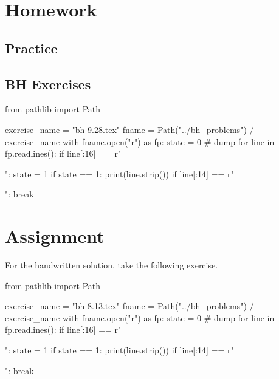 \section{Homework}

\label{sec:homework}

\subsection{Practice}
\label{sec:practice}



\subsection{BH Exercises}
\label{sec:bh-exercises-1}

\begin{pycode}
from pathlib import Path

exercise_name = "bh-9.28.tex"
fname = Path("../bh_problems") / exercise_name
with fname.open("r") as fp:
    state = 0  # dump
    for line in fp.readlines():
        if line[:16] == r"\begin{exercise}":
            state = 1
        if state == 1:
            print(line.strip())
        if line[:14] == r"\end{exercise}":
            break
\end{pycode}







\section{Assignment}
\label{sec:assignment}

For the handwritten solution, take the following exercise.

\begin{pycode}
from pathlib import Path

exercise_name = "bh-8.13.tex"
fname = Path("../bh_problems") / exercise_name
with fname.open("r") as fp:
    state = 0  # dump
    for line in fp.readlines():
        if line[:16] == r"\begin{exercise}":
            state = 1
        if state == 1:
            print(line.strip())
        if line[:14] == r"\end{exercise}":
            break
\end{pycode}








